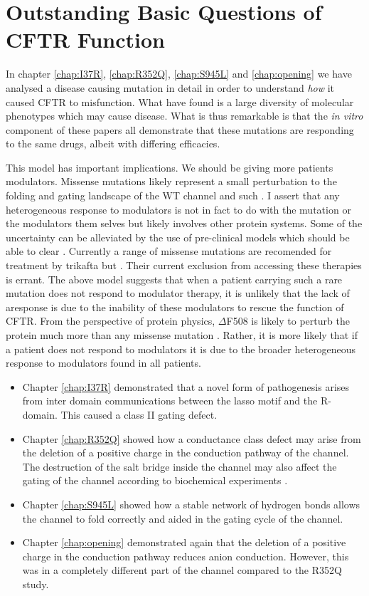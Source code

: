 \section{Outstanding Basic Questions of CFTR Function}
In chapter \ref{chap:I37R}, \ref{chap:R352Q}, \ref{chap:S945L} and \ref{chap:opening} we have analysed a disease causing mutation in detail in order to understand \textit{how} it caused CFTR to misfunction. What have found is a large diversity of molecular phenotypes which may cause disease. What is thus remarkable is that the \textit{in vitro} component of these papers all demonstrate that these mutations are responding to the same drugs, albeit with differing efficacies.


This model has important implications. We should be giving more patients modulators. Missense mutations likely represent a small perturbation to the folding and gating landscape of the WT channel and such . I assert that any heterogeneous response to modulators is not in fact to do with the mutation or the modulators them selves but likely involves other protein systems. Some of the uncertainty can be alleviated by the use of pre-clinical models which should be able to clear . Currently a range of missense mutations are recomended for treatment by trikafta but . Their current exclusion from accessing these therapies is errant. The above model suggests that when a patient carrying such a rare mutation does not respond to modulator therapy, it is unlikely that the lack of aresponse is due to the inability of these modulators to rescue the function of CFTR. From the perspective of protein physics, $\Delta$F508 is likely to perturb the protein much more than any missense mutation \cite{}. Rather, it is more likely that if a patient does not respond to modulators it is due to the broader heterogeneous response to modulators found in all patients. 
\begin{itemize}
	\item Chapter \ref{chap:I37R} demonstrated that a novel form of pathogenesis arises from inter domain communications between the lasso motif and the R-domain.  This caused a class II gating defect. 
\item Chapter \ref{chap:R352Q} showed how a conductance class defect may arise from the deletion of a positive charge in the conduction pathway of the channel. The destruction of the salt bridge inside the channel may also affect the gating of the channel according to biochemical experiments \cite{}.
\item Chapter \ref{chap:S945L} showed how a stable network of hydrogen bonds allows the channel to fold correctly and aided in the gating cycle of the channel. 
\item Chapter \ref{chap:opening} demonstrated again that the deletion of a positive charge in the conduction pathway reduces anion conduction. However, this was in a completely different part of the channel compared to the R352Q study.
\end{itemize}

